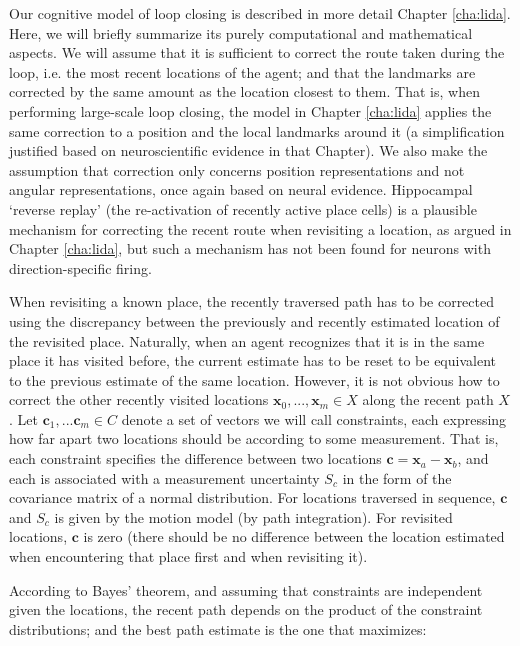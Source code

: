 Our cognitive model of loop closing is described in more detail Chapter \ref{cha:lida}. Here, we will briefly summarize its purely computational and mathematical aspects. We will assume that it is sufficient to correct the route taken during the loop, i.e. the most recent locations of the agent; and that the landmarks are corrected by the same amount as the location closest to them. That is, when performing large-scale loop closing, the model in Chapter \ref{cha:lida} applies the same correction to a position and the local landmarks around it (a simplification justified based on neuroscientific evidence in that Chapter). We also make the assumption that correction only concerns position representations and not angular representations, once again based on neural evidence. Hippocampal `reverse replay' \citep{carr2011hippocampal} (the re-activation of recently active place cells) is a plausible mechanism for correcting the recent route when revisiting a location, as argued in Chapter \ref{cha:lida}, but such a mechanism has not been found for neurons with direction-specific firing.

When revisiting a known place, the recently traversed path has to be corrected using the discrepancy between the previously and recently estimated location of the revisited place. Naturally, when an agent recognizes that it is in the same place it has visited before, the current estimate has to be reset to be equivalent to the previous estimate of the same location. However, it is not obvious how to correct the other recently visited locations $\bm x_0, ..., \bm x_m \in X$ along the recent path $X$. Let $\bm c_1, ... \bm c_m \in C$ denote a set of vectors we will call constraints, each expressing how far apart two locations should be according to some measurement. That is, each constraint specifies the difference between two locations $\bm c=\bm x_a-\bm x_b$, and each is associated with a measurement uncertainty $S_c$ in the form of the covariance matrix of a normal distribution. For locations traversed in sequence, $\bm c$ and $S_c$ is given by the motion model (by path integration). For revisited locations, $\bm c$ is zero (there should be no difference between the location estimated when encountering that place first and when revisiting it). 

According to Bayes' theorem, and assuming that constraints are independent given the locations, the recent path depends on the product of the constraint distributions; and the best path estimate is the one that maximizes:


